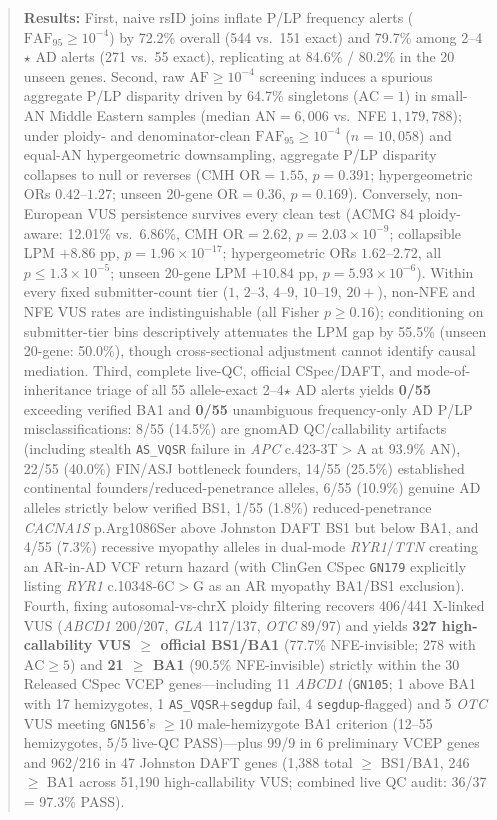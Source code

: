\documentclass[11pt,letterpaper]{article}
\begin{document}
\begin{abstract}
\noindent\textbf{Results:} First, naive rsID joins inflate P/LP frequency alerts ($\mathrm{FAF}_{95}\ge 10^{-4}$) by 72.2\% overall (544 vs.\ 151 exact) and 79.7\% among 2--4$\star$ AD alerts (271 vs.\ 55 exact), replicating at 84.6\% / 80.2\% in the 20 unseen genes. Second, raw $\mathrm{AF}\ge 10^{-4}$ screening induces a spurious aggregate P/LP disparity driven by 64.7\% singletons ($\mathrm{AC}=1$) in small-AN Middle Eastern samples (median $\mathrm{AN}=6,006$ vs.\ NFE $1,179,788$); under ploidy- and denominator-clean $\mathrm{FAF}_{95}\ge 10^{-4}$ ($n=10,058$) and equal-AN hypergeometric downsampling, aggregate P/LP disparity collapses to null or reverses (CMH $\mathrm{OR}=1.55$, $p=0.391$; hypergeometric ORs $0.42$--$1.27$; unseen 20-gene $\mathrm{OR}=0.36$, $p=0.169$). Conversely, non-European VUS persistence survives every clean test (ACMG 84 ploidy-aware: 12.01\% vs.\ 6.86\%, CMH $\mathrm{OR}=2.62$, $p=2.03\times 10^{-9}$; collapsible LPM $+8.86$ pp, $p=1.96\times 10^{-17}$; hypergeometric ORs $1.62$--$2.72$, all $p\le 1.3\times 10^{-5}$; unseen 20-gene LPM $+10.84$ pp, $p=5.93\times 10^{-6}$). Within every fixed submitter-count tier ($1$, $2$--$3$, $4$--$9$, $10$--$19$, $20+$), non-NFE and NFE VUS rates are indistinguishable (all Fisher $p\ge 0.16$); conditioning on submitter-tier bins descriptively attenuates the LPM gap by 55.5\% (unseen 20-gene: 50.0\%), though cross-sectional adjustment cannot identify causal mediation. Third, complete live-QC, official CSpec/DAFT, and mode-of-inheritance triage of all 55 allele-exact 2--4$\star$ AD alerts yields \textbf{0/55} exceeding verified BA1 and \textbf{0/55} unambiguous frequency-only AD P/LP misclassifications: 8/55 (14.5\%) are gnomAD QC/callability artifacts (including stealth \texttt{AS\_VQSR} failure in \textit{APC} c.423-3T$>$A at 93.9\% AN), 22/55 (40.0\%) FIN/ASJ bottleneck founders, 14/55 (25.5\%) established continental founders/reduced-penetrance alleles, 6/55 (10.9\%) genuine AD alleles strictly below verified BS1, 1/55 (1.8\%) reduced-penetrance \textit{CACNA1S} p.Arg1086Ser above Johnston DAFT BS1 but below BA1, and 4/55 (7.3\%) recessive myopathy alleles in dual-mode \textit{RYR1}/\textit{TTN} creating an AR-in-AD VCF return hazard (with ClinGen CSpec \texttt{GN179} explicitly listing \textit{RYR1} c.10348-6C$>$G as an AR myopathy BA1/BS1 exclusion). Fourth, fixing autosomal-vs-chrX ploidy filtering recovers 406/441 X-linked VUS (\textit{ABCD1} 200/207, \textit{GLA} 117/137, \textit{OTC} 89/97) and yields \textbf{327 high-callability VUS $\ge$ official BS1/BA1} (77.7\% NFE-invisible; 278 with $\mathrm{AC}\ge 5$) and \textbf{21 $\ge$ BA1} (90.5\% NFE-invisible) strictly within the 30 Released CSpec VCEP genes---including 11 \textit{ABCD1} (\texttt{GN105}; 1 above BA1 with 17 hemizygotes, 1 \texttt{AS\_VQSR}+\texttt{segdup} fail, 4 \texttt{segdup}-flagged) and 5 \textit{OTC} VUS meeting \texttt{GN156}'s $\ge 10$ male-hemizygote BA1 criterion (12--55 hemizygotes, 5/5 live-QC PASS)---plus 99/9 in 6 preliminary VCEP genes and 962/216 in 47 Johnston DAFT genes (1,388 total $\ge$ BS1/BA1, 246 $\ge$ BA1 across 51,190 high-callability VUS; combined live QC audit: 36/37 = 97.3\% PASS).


\end{abstract}
\end{document}
